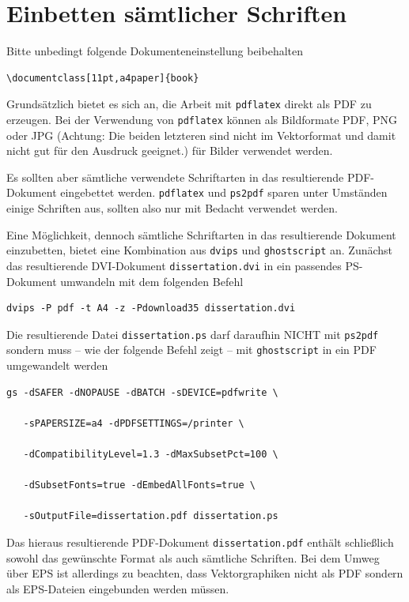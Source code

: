 \section{Einbetten s\"{a}mtlicher Schriften}\label{Schriften}
Bitte unbedingt folgende Dokumenteneinstellung beibehalten

\begin{verbatim}
\documentclass[11pt,a4paper]{book}
\end{verbatim}

Grunds\"{a}tzlich bietet es sich an, die Arbeit mit \texttt{pdflatex} direkt als PDF zu erzeugen. Bei der Verwendung von \texttt{pdflatex} k\"{o}nnen als Bildformate PDF, PNG oder JPG (Achtung: Die beiden letzteren sind nicht im Vektorformat und damit nicht gut f\"{u}r den Ausdruck geeignet.) f\"{u}r Bilder verwendet werden.

Es sollten aber s\"{a}mtliche verwendete Schriftarten in das
resultierende PDF-Do\-kument eingebettet werden. \texttt{pdflatex}
und \texttt{ps2pdf} sparen unter Umst\"{a}nden einige Schriften aus, sollten also nur mit Bedacht verwendet werden.

Eine M\"{o}glichkeit, dennoch s\"{a}mtliche Schriftarten in das
resultierende Dokument einzubetten, bietet eine Kombination aus
\texttt{dvips} und \texttt{ghostscript} an. Zun\"{a}chst das
resultierende DVI-Dokument \texttt{dissertation.dvi} in ein
passendes PS-Dokument umwandeln mit dem folgenden Befehl

\begin{verbatim}
dvips -P pdf -t A4 -z -Pdownload35 dissertation.dvi
\end{verbatim}

Die resultierende Datei \texttt{dissertation.ps} darf daraufhin
NICHT mit
\texttt{ps2pdf} sondern muss -- wie der folgende Befehl zeigt --
mit \texttt{ghostscript} in ein PDF umgewandelt werden

\begin{verbatim}
gs -dSAFER -dNOPAUSE -dBATCH -sDEVICE=pdfwrite \

   -sPAPERSIZE=a4 -dPDFSETTINGS=/printer \

   -dCompatibilityLevel=1.3 -dMaxSubsetPct=100 \

   -dSubsetFonts=true -dEmbedAllFonts=true \

   -sOutputFile=dissertation.pdf dissertation.ps
\end{verbatim}

Das hieraus resultierende PDF-Dokument \texttt{dissertation.pdf}
enth\"{a}lt schlie{\ss}lich sowohl das gew\"{u}nschte Format als auch
s\"{a}mtliche Schriften. Bei dem Umweg \"{u}ber EPS ist allerdings zu beachten, dass Vektorgraphiken nicht als PDF sondern als EPS-Dateien eingebunden werden m\"{u}ssen.

